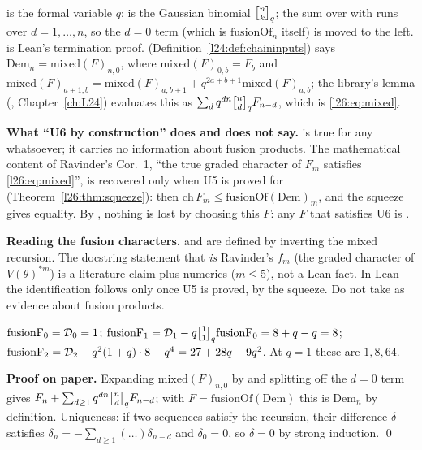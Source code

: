 \begin{dictionary}
 is the formal variable $q$;  is the Gaussian binomial
$\ltwentysixqb nk$; the sum over  with  runs over $d=1,\dots,n$, so the $d=0$ term (which is
$\mathrm{fusionOf}_n$ itself) is moved to the left.  is Lean's termination proof. (Definition~\ref{l24:def:chaininputs}) says $\mathrm{Dem}_n=\mathrm{mixed}(F)_{n,0}$,
where $\mathrm{mixed}(F)_{0,b}=F_b$ and $\mathrm{mixed}(F)_{a+1,b}=\mathrm{mixed}(F)_{a,b+1}+q^{2a+b+1}\mathrm{mixed}(F)_{a,b}$;
the library's lemma  (, Chapter~\ref{ch:L24}) evaluates this as
$\sum_dq^{dn}\ltwentysixqb nd F_{n-d}$, which is \eqref{l26:eq:mixed}.

\textbf{What ``U6 by construction'' does and does not say.}  is true for any
 whatsoever; it carries no information about fusion products. The mathematical content of Ravinder's Cor.~1,
``the true graded character of $F_m$ satisfies \eqref{l26:eq:mixed}'', is recovered only when U5 is proved for
 (Theorem~\ref{l26:thm:squeeze}): then $\mathrm{ch}\,F_m\le\mathrm{fusionOf}(\mathrm{Dem})_m$, and the squeeze
gives equality. By , nothing is lost by choosing this $F$: any $F$ that satisfies U6 is
.
\end{dictionary}

\begin{warning}
\textbf{Reading the fusion characters.}  and  are defined by inverting the mixed recursion. The
docstring statement that  \emph{is} Ravinder's $f_m$ (the graded character of $V(\theta)^{*m}$) is a literature
claim plus numerics ($m\le5$), not a Lean fact. In Lean the identification follows only once U5 is proved, by the squeeze. Do not
take  as evidence about fusion products.
\end{warning}

\begin{example}[$\mathfrak{sl}_3$, $n\le2$]\label{l26:ex:fusionF}
$\mathrm{fusionF}_0=\mathcal D_0=1$; $\mathrm{fusionF}_1=\ltwentysixD_1-q\ltwentysixqb11\mathrm{fusionF}_0=8+q-q=8$;
$\mathrm{fusionF}_2=\mathcal D_2-q^2(1+q)\cdot8-q^4=27+28q+9q^2$. At $q=1$ these are $1,8,64$.
\end{example}

\textbf{Proof on paper.} Expanding $\mathrm{mixed}(F)_{n,0}$ by  and splitting off the $d=0$ term gives
$F_n+\sum_{d\ge1}q^{dn}\ltwentysixqb nd F_{n-d}$; with $F=\mathrm{fusionOf}(\mathrm{Dem})$ this is
$\mathrm{Dem}_n$ by definition. Uniqueness: if two sequences satisfy the recursion, their difference
$\delta$ satisfies $\delta_n=-\sum_{d\ge1}(\dots)\delta_{n-d}$ and $\delta_0=0$, so $\delta=0$ by strong induction. \qed

